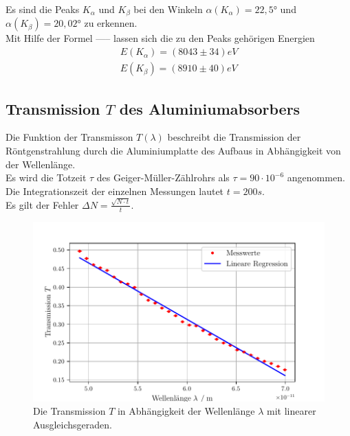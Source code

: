 Es sind die Peaks $K_{\alpha}$ und $K_{\beta}$ bei den Winkeln $\alpha(K_{\alpha})= 22,5°$ 
und $\alpha(K_{\beta}) = 20,02°$ zu erkennen.\\

Mit Hilfe der Formel ----- lassen sich die zu den Peaks gehörigen Energien
\begin{align*}
  E(K_{\alpha}) = (8043 \pm 34) eV \\
  E(K_{\beta}) = (8910 \pm 40) eV
\end{align*}





\subsection{Transmission $T$ des Aluminiumabsorbers}
\label{subsec:transmission}

Die Funktion der Transmisson $T(\lambda)$ beschreibt die Transmission der 
Röntgenstrahlung durch die Aluminiumplatte des Aufbaus in Abhängigkeit von der Wellenlänge.\\

Es wird die Totzeit $\tau$ des Geiger-Müller-Zählrohrs als $\tau = 90 \cdot 10^{-6}$ angenommen. Die 
Integrationszeit der einzelnen Messungen lautet $t = 200s$. \\
Es gilt der Fehler $\Delta N = \frac{\sqrt{N \cdot t}}{t}$.\\


\begin{figure}
  \centering
  \includegraphics{build/transmission.pdf}
  \caption{Die Transmission $T$ in Abhängigkeit der Wellenlänge $\lambda$ mit linearer Ausgleichsgeraden.}
  \label{fig:transm}
\end{figure}

